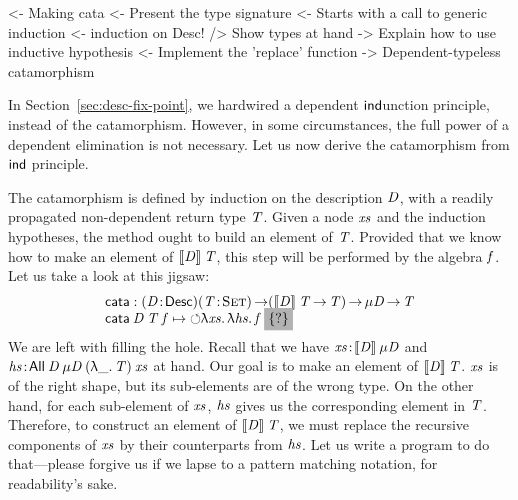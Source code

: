 \begin{wstructure}
<- Making cata
    <- Present the type signature
    <- Starts with a call to generic induction
        <- induction on Desc!
        /> Show types at hand
        -> Explain how to use inductive hypothesis
    <- Implement the 'replace' function
    -> Dependent-typeless catamorphism 
\end{wstructure}

In Section~\ref{sec:desc-fix-point}, we hardwired a dependent
$\F{ind}$unction principle, instead of the catamorphism. However, in
some circumstances, the full power of a dependent elimination is not
necessary. Let us now derive the catamorphism
from $\F{ind}$ principle.

\newcommand{\cata}{\F{cata}}

The catamorphism is defined by induction on the description $\V{D}$,
with a readily propagated non-dependent return type $\V{T}$.
Given a node $\V{xs}$
and the induction hypotheses, the method ought to build an element of
$\V{T}$. Provided that we know how to make an element of
$\descop{\V{D}}{\V{T}}$, this step will be performed by the algebra
$\V{f}$. Let us take a look at this jigsaw:
%
\[\stk{
\cata : \PITEL{\V{D}}{\Desc}
           \PI{\V{T}}{\Set}
           (\descop{\V{D}}{\V{T}} \To \V{T}) \To 
           \Mu{\V{D}} \To \V{T} \\
\cata\: \V{D}\: \V{T}\: \V{f} \mapsto
  \sind \LAM{\V{xs}}\LAM{\V{hs}} \V{f}\: \SHED
}\]
% 
We are left with filling the hole. Recall that we have
\(\Bhab{\V{xs}}{\descop{\V{D}}{\Mu{\V{D}}}}\) and
\(\Bhab{\V{hs}}{\All{\V{D}}{\Mu{\V{D}}}{(\LAM{\_} \V{T})}{\V{xs}}}\)
at hand. Our goal is to make an element of
\(\descop{\V{D}}{\V{T}}\). $\V{xs}$ is of the right shape, but its
sub-elements are of the wrong type. On the other hand, for each
sub-element of $\V{xs}$, $\V{hs}$ gives us the corresponding element
in $\V{T}$.  Therefore, to construct an element of
\(\descop{\V{D}}{\V{T}}\), we must replace the recursive components of
\(\V{xs}\) by their counterparts from \(\V{hs}\). Let us write a
program to do that---please forgive us if we lapse to a pattern
matching notation, for readability's sake.
%
